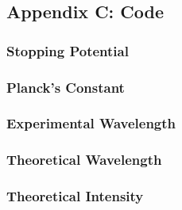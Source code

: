 \documentclass[a4paper]{article}
\begin{document}
\subsection{Appendix C: Code}

\subsubsection{Stopping Potential}
\label{cod:stoppingPotential}

\subsubsection{Planck's Constant}
\label{cod:planck}

\subsubsection{Experimental Wavelength}
\label{cod:expWavelength}

\subsubsection{Theoretical Wavelength}
\label{cod:theoWavelength}

\subsubsection{Theoretical Intensity}
\label{cod:theoIntensity}
\end{document}
